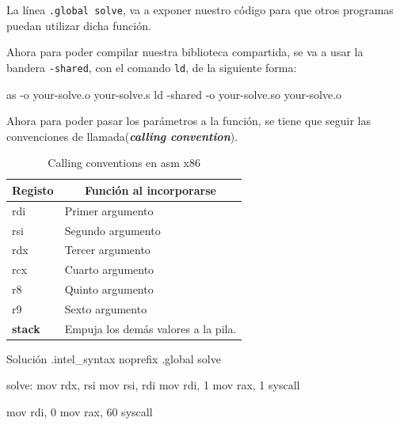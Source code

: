 La línea \texttt{.global solve}, va a exponer nuestro código para
que otros programas puedan utilizar dicha función.

Ahora para poder compilar nuestra biblioteca compartida, se va a usar la bandera
\texttt{-shared}, con el comando \texttt{ld}, de la siguiente forma:

\begin{codebox}[ASM]{}
	as -o your-solve.o your-solve.s
	ld -shared -o your-solve.so your-solve.o
\end{codebox}

Ahora para poder pasar los parámetros a la función, se tiene que seguir
las convenciones de llamada(\textbf{\textit{calling convention}}).

\begin{table}[htpb]
	\begin{center}
		\begin{tabular}[c]{l|l}
			\hline
			\multicolumn{1}{c|}{\textbf{Registo}} &
			\multicolumn{1}{c}{\textbf{Función al incorporarse}}                        \\
			\hline
			rdi                                   & Primer argumento                    \\
			rsi                                   & Segundo argumento                   \\
			rdx                                   & Tercer argumento                    \\
			rcx                                   & Cuarto argumento                    \\
			r8                                    & Quinto argumento                    \\
			r9                                    & Sexto argumento                     \\
			\textbf{stack}                        & Empuja los demás valores a la pila. \\

			\hline
		\end{tabular}
	\end{center}
	\caption{ Calling conventions en asm x86  }\label{tab:calling_convention_x86}
\end{table}

\begin{codebox}[ASM]{Solución}
	.intel_syntax noprefix
	.global solve

	solve:
	mov rdx, rsi
	mov rsi, rdi
	mov rdi, 1
	mov rax, 1
	syscall

	mov rdi, 0
	mov rax, 60
	syscall
\end{codebox}

